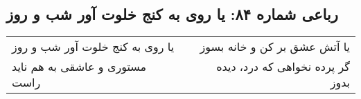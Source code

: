 \begin{center}
\section*{رباعی شماره ۸۴: یا روی به کنج خلوت آور شب و روز}
\label{sec:084}
\begin{longtable}{l p{0.5cm} r}
یا روی به کنج خلوت آور شب و روز
&&
یا آتش عشق بر کن و خانه بسوز
\\
مستوری و عاشقی به هم ناید راست
&&
گر پرده نخواهی که درد، دیده بدوز
\\
\end{longtable}
\end{center}
